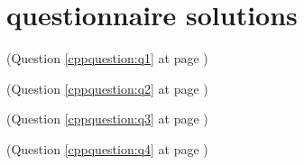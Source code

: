 \chapter{\CC questionnaire solutions}

\begin{cppanswer}
    \label{cppquestion:s1}
    (Question \ref{cppquestion:q1} at page \pageref{cppquestion:q1}) \hfill \\

\end{cppanswer}

\begin{cppanswer}
    \label{cppquestion:s2}
    (Question \ref{cppquestion:q2} at page \pageref{cppquestion:q2}) \hfill \\
    
\end{cppanswer}

\begin{cppanswer}
    \label{cppquestion:s3}
    (Question \ref{cppquestion:q3} at page \pageref{cppquestion:q3}) \hfill \\

\end{cppanswer}

\begin{cppanswer}
    \label{cppquestion:s4}
    (Question \ref{cppquestion:q4} at page \pageref{cppquestion:q4}) \hfill \\

\end{cppanswer}

